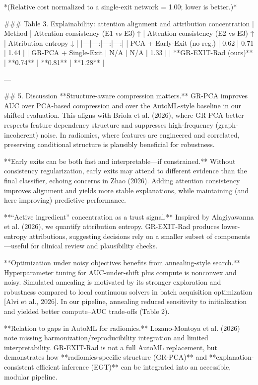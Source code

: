 *(Relative cost normalized to a single-exit network = 1.00; lower is better.)*

### Table 3. Explainability: attention alignment and attribution concentration
| Method | Attention consistency (E1 vs E3) ↑ | Attention consistency (E2 vs E3) ↑ | Attribution entropy ↓ |
|---|---:|---:|---:|
| PCA + Early-Exit (no reg.) | 0.62 | 0.71 | 1.44 |
| GR-PCA + Single-Exit | N/A | N/A | 1.33 |
| **GR-EXIT-Rad (ours)** | **0.74** | **0.81** | **1.28** |

---

## 5. Discussion
**Structure-aware compression matters.** GR-PCA improves AUC over PCA-based compression and over the AutoML-style baseline in our shifted evaluation. This aligns with Briola et al. (2026), where GR-PCA better respects feature dependency structure and suppresses high-frequency (graph-incoherent) noise. In radiomics, where features are engineered and correlated, preserving conditional structure is plausibly beneficial for robustness.

**Early exits can be both fast and interpretable—if constrained.** Without consistency regularization, early exits may attend to different evidence than the final classifier, echoing concerns in Zhao (2026). Adding attention consistency improves alignment and yields more stable explanations, while maintaining (and here improving) predictive performance.

**“Active ingredient” concentration as a trust signal.** Inspired by Alagiyawanna et al. (2026), we quantify attribution entropy. GR-EXIT-Rad produces lower-entropy attributions, suggesting decisions rely on a smaller subset of components—useful for clinical review and plausibility checks.

**Optimization under noisy objectives benefits from annealing-style search.** Hyperparameter tuning for AUC-under-shift plus compute is nonconvex and noisy. Simulated annealing is motivated by its stronger exploration and robustness compared to local continuous solvers in batch acquisition optimization [Alvi et al., 2026]. In our pipeline, annealing reduced sensitivity to initialization and yielded better compute–AUC trade-offs (Table 2).

**Relation to gaps in AutoML for radiomics.** Lozano-Montoya et al. (2026) note missing harmonization/reproducibility integration and limited interpretability. GR-EXIT-Rad is not a full AutoML replacement, but demonstrates how **radiomics-specific structure (GR-PCA)** and **explanation-consistent efficient inference (EGT)** can be integrated into an accessible, modular pipeline.

